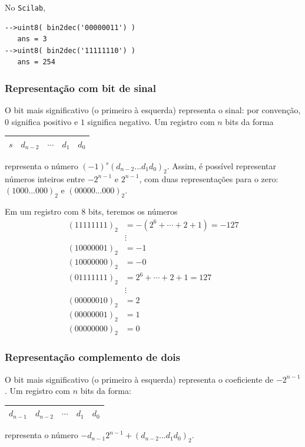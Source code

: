 \ifisscilab
\begin{ex}
  No \verb+Scilab+,
\begin{verbatim}
-->uint8( bin2dec('00000011') )
   ans = 3
-->uint8( bin2dec('11111110') )
   ans = 254
\end{verbatim}
\end{ex}
\fi

\subsubsection{Representação com bit de sinal}
O bit mais significativo (o primeiro à esquerda) representa o sinal: por convenção, $0$ significa positivo e $1$ significa negativo. Um registro com $n$ bits da forma
\begin{center}
  \begin{tabular}{|c|c|c|c|c|} \hline
    $s$ & $d_{n-2}$ & $\cdots$ & $d_1$ & $d_0$ \\\hline
  \end{tabular}  
\end{center}
representa o número $(-1)^s(d_{n-2}...d_1d_0)_2$. Assim, é possível representar números inteiros entre $-2^{n-1}$ e $2^{n-1}$, com duas representações para o zero: $(1000...000)_2$ e $(00000...000)_2$.

\begin{ex}
Em um registro com $8$ bits, teremos os números
\begin{equation*}
\begin{split}
 (11111111)_2 &= -(2^{6}+\cdots+2+1)=-127\\
 &\vdots    \\
 (10000001)_2 &= -1 \\
 (10000000)_2 &= -0 \\
 (01111111)_2 &= 2^6+\cdots+2+1=127 \\
 &\vdots    \\
 (00000010)_2 &= 2 \\
 (00000001)_2 &= 1 \\
 (00000000)_2 &= 0 
\end{split}  
\end{equation*}
\end{ex}


\subsubsection{Representação complemento de dois}
O bit mais significativo (o primeiro à esquerda) representa o coeficiente de $-2^{n-1}$.  Um registro com $n$ bits da forma:
\begin{center}
  \begin{tabular}{|c|c|c|c|c|} \hline
    $d_{n-1}$ & $d_{n-2}$ & $\cdots$ & $d_1$ & $d_0$\\\hline
  \end{tabular}    
\end{center}
representa o número $-d_{n-1}2^{n-1}+(d_{n-2}...d_1d_0)_2$. 

